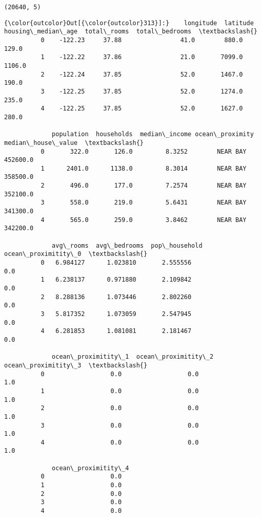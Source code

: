 \documentclass[11pt]{article}
\begin{document}
    \begin{Verbatim}[commandchars=\\\{\}]
(20640, 5)

    \end{Verbatim}

\begin{Verbatim}[commandchars=\\\{\}]
{\color{outcolor}Out[{\color{outcolor}313}]:}    longitude  latitude  housing\_median\_age  total\_rooms  total\_bedrooms  \textbackslash{}
          0    -122.23     37.88                41.0        880.0           129.0   
          1    -122.22     37.86                21.0       7099.0          1106.0   
          2    -122.24     37.85                52.0       1467.0           190.0   
          3    -122.25     37.85                52.0       1274.0           235.0   
          4    -122.25     37.85                52.0       1627.0           280.0   
          
             population  households  median\_income ocean\_proximity  median\_house\_value  \textbackslash{}
          0       322.0       126.0         8.3252        NEAR BAY            452600.0   
          1      2401.0      1138.0         8.3014        NEAR BAY            358500.0   
          2       496.0       177.0         7.2574        NEAR BAY            352100.0   
          3       558.0       219.0         5.6431        NEAR BAY            341300.0   
          4       565.0       259.0         3.8462        NEAR BAY            342200.0   
          
             avg\_rooms  avg\_bedrooms  pop\_household  ocean\_proximitity\_0  \textbackslash{}
          0   6.984127      1.023810       2.555556                  0.0   
          1   6.238137      0.971880       2.109842                  0.0   
          2   8.288136      1.073446       2.802260                  0.0   
          3   5.817352      1.073059       2.547945                  0.0   
          4   6.281853      1.081081       2.181467                  0.0   
          
             ocean\_proximitity\_1  ocean\_proximitity\_2  ocean\_proximitity\_3  \textbackslash{}
          0                  0.0                  0.0                  1.0   
          1                  0.0                  0.0                  1.0   
          2                  0.0                  0.0                  1.0   
          3                  0.0                  0.0                  1.0   
          4                  0.0                  0.0                  1.0   
          
             ocean\_proximitity\_4  
          0                  0.0  
          1                  0.0  
          2                  0.0  
          3                  0.0  
          4                  0.0  
\end{Verbatim}
            
\end{document}

